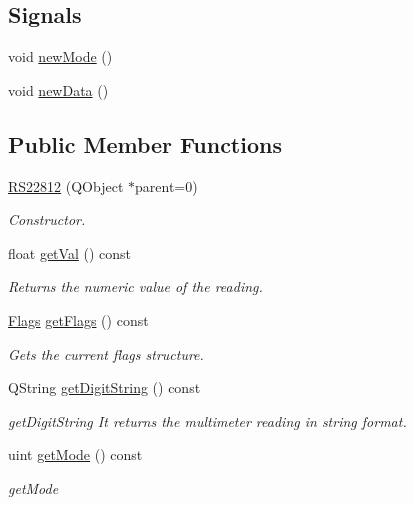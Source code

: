 \subsection*{Signals}
\begin{DoxyCompactItemize}
\item 
void \hyperlink{class_r_s22812_a47691c122c8ad0716dc7c86b1bf01bb8}{new\-Mode} ()
\item 
void \hyperlink{class_r_s22812_afdbd28cc7f8abb95f13ad9d795c6c10d}{new\-Data} ()
\end{DoxyCompactItemize}
\subsection*{Public Member Functions}
\begin{DoxyCompactItemize}
\item 
\hyperlink{class_r_s22812_ac5e60fb0fe61e2be5db4d5caab46c827}{R\-S22812} (Q\-Object $\ast$parent=0)
\begin{DoxyCompactList}\small\item\em Constructor. \end{DoxyCompactList}\item 
float \hyperlink{class_r_s22812_a80e53a20cbe5c9c670e8b8309d043475}{get\-Val} () const 
\begin{DoxyCompactList}\small\item\em Returns the numeric value of the reading. \end{DoxyCompactList}\item 
\hyperlink{struct_flags}{Flags} \hyperlink{class_r_s22812_a4ae945cdd647a66f6e7d54f20f77502e}{get\-Flags} () const 
\begin{DoxyCompactList}\small\item\em Gets the current flags structure. \end{DoxyCompactList}\item 
Q\-String \hyperlink{class_r_s22812_aee09c692d82aacb68a598091ea4b6597}{get\-Digit\-String} () const 
\begin{DoxyCompactList}\small\item\em get\-Digit\-String It returns the multimeter reading in string format. \end{DoxyCompactList}\item 
uint \hyperlink{class_r_s22812_a72884c3f25b59129ac21dca9f68a664f}{get\-Mode} () const 
\begin{DoxyCompactList}\small\item\em get\-Mode \end{DoxyCompactList}\end{DoxyCompactItemize}
